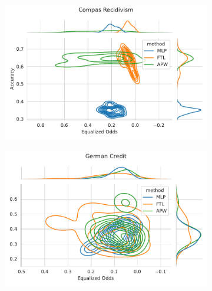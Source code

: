 \begin{figure}
\begin{subfigure}{.45\linewidth}
    \includegraphics[width=1\linewidth]{images/pareto_acc_odds_compas.pdf}
\end{subfigure}
\begin{subfigure}{.45\linewidth}
    \includegraphics[width=1\linewidth]{images/pareto_mcc_odds_german.pdf}
\end{subfigure}
\end{figure}
